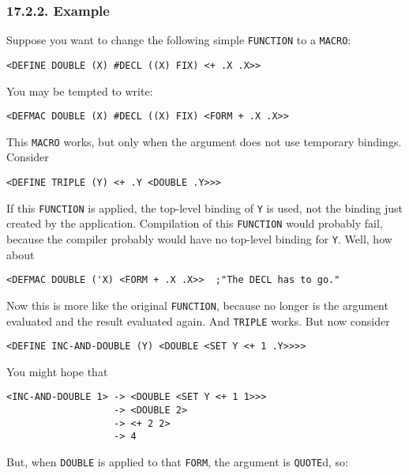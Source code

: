 \documentclass[a4paper,]{article}
\begin{document}
\subsubsection{17.2.2. Example}\label{example}

Suppose you want to change the following simple \texttt{FUNCTION} to a \texttt{MACRO}:

\begin{verbatim}
<DEFINE DOUBLE (X) #DECL ((X) FIX) <+ .X .X>>
\end{verbatim}

You may be tempted to write:

\begin{verbatim}
<DEFMAC DOUBLE (X) #DECL ((X) FIX) <FORM + .X .X>>
\end{verbatim}

This \texttt{MACRO} works, but only when the argument does not use temporary bindings. Consider

\begin{verbatim}
<DEFINE TRIPLE (Y) <+ .Y <DOUBLE .Y>>>
\end{verbatim}

If this \texttt{FUNCTION} is applied, the top-level binding of \texttt{Y} is used, not the binding just created by the
application. Compilation of this \texttt{FUNCTION} would probably fail, because the compiler probably would have no
top-level binding for \texttt{Y}. Well, how about

\begin{verbatim}
<DEFMAC DOUBLE ('X) <FORM + .X .X>>  ;"The DECL has to go."
\end{verbatim}

Now this is more like the original \texttt{FUNCTION}, because no longer is the argument evaluated and the result evaluated
again. And \texttt{TRIPLE} works. But now consider

\begin{verbatim}
<DEFINE INC-AND-DOUBLE (Y) <DOUBLE <SET Y <+ 1 .Y>>>>
\end{verbatim}

You might hope that

\begin{verbatim}
<INC-AND-DOUBLE 1> -> <DOUBLE <SET Y <+ 1 1>>>
                   -> <DOUBLE 2>
                   -> <+ 2 2>
                   -> 4
\end{verbatim}

But, when \texttt{DOUBLE} is applied to that \texttt{FORM}, the argument is \texttt{QUOTE}d, so:
\end{document}

